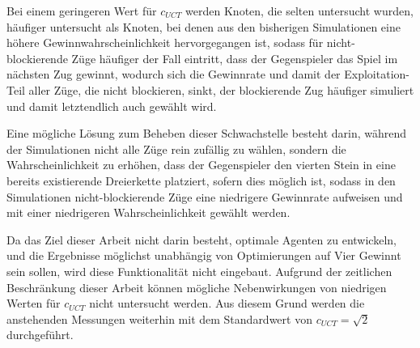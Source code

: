 Bei einem geringeren Wert für $c_{UCT}$ werden Knoten, die selten untersucht wurden, häufiger untersucht als Knoten, bei denen aus den bisherigen Simulationen eine höhere Gewinnwahrscheinlichkeit hervorgegangen ist, sodass für nicht-blockierende Züge häufiger der Fall eintritt, dass der Gegenspieler das Spiel im nächsten Zug gewinnt, wodurch sich die Gewinnrate und damit der Exploitation-Teil aller Züge, die nicht blockieren, sinkt, der blockierende Zug häufiger simuliert und damit letztendlich auch gewählt wird.

Eine mögliche Lösung zum Beheben dieser Schwachstelle besteht darin, während der Simulationen nicht alle Züge rein zufällig zu wählen, sondern die Wahrscheinlichkeit zu erhöhen, dass der Gegenspieler den vierten Stein in eine bereits existierende Dreierkette platziert, sofern dies möglich ist, sodass in den Simulationen nicht-blockierende Züge eine niedrigere Gewinnrate aufweisen und mit einer niedrigeren Wahrscheinlichkeit gewählt werden.

Da das Ziel dieser Arbeit nicht darin besteht, optimale Agenten zu entwickeln, und die Ergebnisse möglichst unabhängig von Optimierungen auf Vier Gewinnt sein sollen, wird diese Funktionalität nicht eingebaut. Aufgrund der zeitlichen Beschränkung dieser Arbeit können mögliche Nebenwirkungen von niedrigen Werten für $c_{UCT}$ nicht untersucht werden. Aus diesem Grund werden die anstehenden Messungen weiterhin mit dem Standardwert von $c_{UCT} = \sqrt2$ durchgeführt.



\newpage